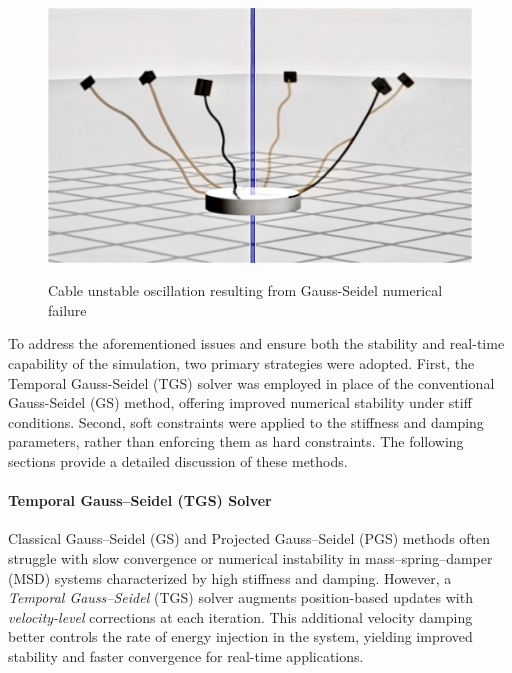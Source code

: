 \documentclass[12pt,twoside,letterpaper]{article}
\begin{document}
\begin{figure}[H]
  \centering
  \begin{minipage}{0.65\textwidth}
    \centering
    \includegraphics[width=\textwidth]{figures/fault.jpg}
    \label{failure}
  \end{minipage}
  \caption{Cable unstable oscillation resulting from Gauss-Seidel numerical failure}
\end{figure}

To address the aforementioned issues and ensure both the stability and real-time capability of the simulation, two primary strategies were adopted. First, the Temporal Gauss-Seidel (TGS) solver was employed in place of the conventional Gauss-Seidel (GS) method, offering improved numerical stability under stiff conditions. Second, soft constraints were applied to the stiffness and damping parameters, rather than enforcing them as hard constraints. The following sections provide a detailed discussion of these methods.

\paragraph{Temporal Gauss--Seidel (TGS) Solver}
Classical Gauss--Seidel (GS) and Projected Gauss--Seidel (PGS) methods often struggle with slow convergence or numerical instability in mass--spring--damper (MSD) systems characterized by high stiffness and damping. However, a \emph{Temporal Gauss--Seidel} (TGS) solver augments position-based updates with \emph{velocity-level} corrections at each iteration. This additional velocity damping better controls the rate of energy injection in the system, yielding improved stability and faster convergence for real-time applications.
\end{document}
